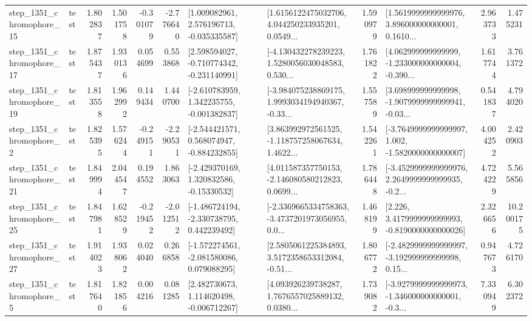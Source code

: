 \begin{tabular}{llrrrrllrlrr}
 step\_1351\_chromophore\_15 &      test &      1.802837 &    1.501758 &     -0.301079 & -2.776640 &    [1.009082961, 2.576196713, -0.035335587] &  [1.6156122475032706, 4.044250233935201, 0.0549... &       1.590979 &  [1.5619999999999976, 3.896000000000001, 0.1610... &            2.963733 &          1.475231 \\
 step\_1351\_chromophore\_17 &      test &      1.875437 &    1.930136 &      0.054699 &  0.553868 &   [2.598594027, -0.710774342, -0.231140991] &  [-4.130432278239223, 1.5280056030048583, 0.530... &       1.761822 &  [4.062999999999999, -1.233000000000004, -0.390... &            1.617744 &          3.761372 \\
 step\_1351\_chromophore\_19 &      test &      1.813558 &    1.962992 &      0.149434 &  1.440700 &   [-2.610783959, 1.342235755, -0.001382837] &  [-3.984075238869175, 1.9993034194940367, -0.33... &       1.557589 &  [3.698999999999998, -1.9079999999999941, -0.03... &            0.541837 &          4.794020 \\
  step\_1351\_chromophore\_2 &      test &      1.825395 &    1.576244 &     -0.249151 & -2.290531 &   [-2.544421571, 0.568074947, -0.884232855] &  [3.863992972561525, -1.118757258067634, 1.4622... &       1.542261 &  [-3.7649999999999997, 1.002, -1.5820000000000007] &            4.004252 &          2.420903 \\
 step\_1351\_chromophore\_21 &      test &      1.849994 &    2.044547 &      0.194552 &  1.863063 &    [-2.429370169, 1.320832586, -0.15330532] &  [4.011587357750153, -2.146080580212823, 0.0699... &       1.786448 &  [-3.4529999999999976, 2.2649999999999935, -0.2... &            4.724229 &          5.565856 \\
 step\_1351\_chromophore\_25 &      test &      1.847981 &    1.628529 &     -0.219452 & -2.012512 &   [-1.486724194, -2.330738795, 0.442239492] &  [-2.3369665334758363, -3.4737201973056955, 0.0... &       1.468199 &   [2.226, 3.4179999999999993, -0.8190000000000026] &            2.326656 &         10.200175 \\
 step\_1351\_chromophore\_27 &      test &      1.914023 &    1.938062 &      0.024040 &  0.266858 &   [-1.572274561, -2.081580086, 0.079088295] &  [2.5805061225384893, 3.5172358653312084, -0.51... &       1.806772 &  [-2.4829999999999997, -3.192999999999998, 0.15... &            0.947673 &          4.726170 \\
  step\_1351\_chromophore\_5 &      test &      1.817640 &    1.821856 &      0.004216 &  0.081285 &    [2.482730673, 1.114620498, -0.006712267] &  [4.093926239738287, 1.7676557025889132, 0.0380... &       1.739082 &  [-3.9279999999999973, -1.346000000000001, -0.3... &            7.330949 &          6.302372 \\

\end{tabular}
